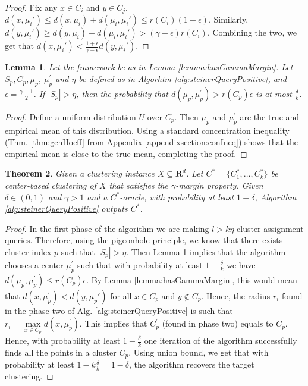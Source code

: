 \documentclass[12pt]{article}
\newcommand{\mb}{\mathbf}
\newtheorem{theorem}{Theorem}
\newtheorem{lemma}[theorem]{Lemma}
\begin{document}
\begin{proof}
Fix any $x \in C_i$ and $y \in C_j$. $d(x, \mu_i') \le d(x, \mu_i)+d(\mu_i, \mu_i') \le r(C_i) (1+\epsilon)$. Similarly, $d(y, \mu_i') \ge d(y, \mu_i) - d(\mu_i, \mu_i') > (\gamma -\epsilon)r(C_i)$. Combining the two, we get that $d(x, \mu_i') < \frac{1+\epsilon}{\gamma-\epsilon}d(y, \mu_i')$. 
\end{proof}

\begin{lemma}
\label{lemma:phase1}
Let the framework be as in Lemma \ref{lemma:hasGammaMargin}. Let $S_p, C_p, \mu_p$, $\mu_p^\prime$ and $\eta$ be defined as in Algorhtm \ref{alg:steinerQueryPositive}, and $\epsilon = \frac{\gamma - 1}{2}$. If $|S_p| > \eta$, then the probability that $d(\mu_p, \mu_p^\prime) > r(C_p)\epsilon$ is at most $\frac{\delta}{k}$.
\end{lemma}
\begin{proof}
Define a uniform distribution $U$ over $C_p$. Then $\mu_p$ and $\mu_p^\prime$ are the true and empirical mean of this distribution. Using a standard concentration inequality (Thm. \ref{thm:genHoeff} from Appendix \ref{appendixsection:conIneq}) shows that the empirical mean is close to the true mean, completing the proof. 

\end{proof}

\begin{theorem}
\label{thm:steinerQueryPositive}
Given a clustering instance $X \subseteq \mb R^d$. Let $C^* = \{C_1^*, \ldots, C_k^*\}$ be center-based clustering of $X$ that satisfies the $\gamma$-margin property. Given $\delta \in (0, 1)$ and $\gamma > 1$ and a $C^*$-oracle, with probability at least $1-\delta$, Algorithm \ref{alg:steinerQueryPositive} outputs $C^*$.
\end{theorem}

\begin{proof}
In the first phase of the algorithm we are making $l>k\eta$ cluster-assignment queries. Therefore, using the pigeonhole principle, we know that there exists cluster index $p$ such that $|S_p| > \eta$. Then Lemma \ref{lemma:phase1} implies that the algorithm chooses a center $\mu_p^\prime$ such that with probability at least $1-\frac{\delta}{k}$ we have $d(\mu_p, \mu_p^\prime) \le r(C_p)\epsilon$. By Lemma \ref{lemma:hasGammaMargin}, this would mean that $d(x, \mu_p^\prime) < d(y, \mu_p')$ for all $x \in C_p$ and $y \not\in C_p$. Hence, the radius $r_i$ found in the phase two of Alg. \ref{alg:steinerQueryPositive} is such that $r_{i} = \max\limits_{x \in C_p} d(x, \mu_p^\prime)$. This implies that $C_p^\prime$ (found in phase two) equals to $C_p$. Hence, with probability at least $1-\frac{\delta}{k}$ one iteration of the algorithm successfully finds all the points in a cluster $C_p$. Using union bound, we get that with probability at least $1-k\frac{\delta}{k} = 1-\delta$, the algorithm recovers the target clustering.
\end{proof}
\end{document}

